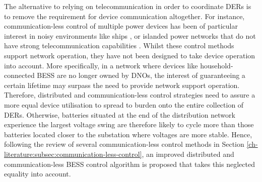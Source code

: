 The alternative to relying on telecommunication in order to coordinate DERs is to remove the requirement for device communication altogether.
For instance, communication-less control of multiple power devices has been of particular interest in noisy environments like ships \cite{Baldwin2004}, or islanded power networks that do not have strong telecommunication capabilities \cite{Diaz2017}.
Whilst these control methods support network operation, they have not been designed to take device operation into account.
More specifically, in a network where devices like household-connected BESS are no longer owned by DNOs, the interest of guaranteeing a certain lifetime may surpass the need to provide network support operation.
Therefore, distributed and communication-less control strategies need to assure a more equal device utilisation to spread to burden onto the entire collection of DERs.
Otherwise, batteries situated at the end of the distribution network experience the largest voltage swing are therefore likely to cycle more than those batteries located closer to the substation where voltages are more stable.
Hence, following the review of several communication-less control methods in Section \ref{ch-literature:subsec:communication-less-control}, an improved distributed and communication-less BESS control algorithm is proposed that takes this neglected equality into account. 

%





